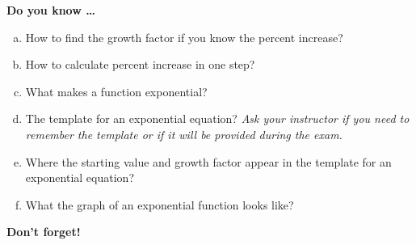 \newpage



\bigskip

\noindent \textbf{Do you know \ldots} %

\begin{enumerate} [(a)]
\item How to find the growth factor if you know the percent increase?    
\item How to calculate percent increase in one step?   
\item What makes a function exponential?   
\item The template for an exponential equation? \emph{Ask your instructor if you need to remember the template or if it will be provided during the exam.} 
\item Where the starting value and growth factor appear in the template for an exponential equation?   
\item What the graph of an exponential function looks like? 
\end{enumerate}

\bigskip

\noindent \textbf{Don't forget!}
